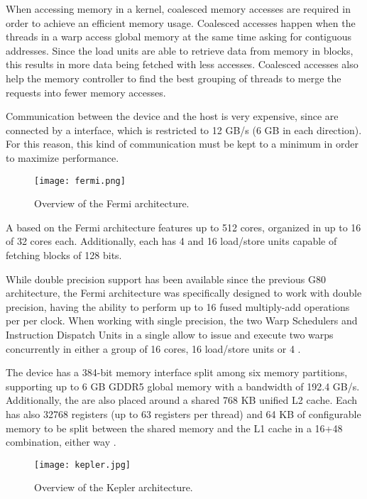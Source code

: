 When accessing memory in a \cuda kernel, coalesced memory accesses are required in order to achieve an efficient memory usage. Coalesced accesses happen when the threads in a warp access global memory at the same time asking for contiguous addresses. Since the load units are able to retrieve data from memory in blocks, this results in more data being fetched with less accesses. Coalesced accesses also help the memory controller to find the best grouping of threads to merge the requests into fewer memory accesses.

Communication between the device and the host \cpu is very expensive, since \gpus are connected by a \pcie interface, which is restricted to 12 GB/s (6 GB in each direction). For this reason, this kind of communication must be kept to a minimum in order to maximize performance.


\begin{figure}
	\begin{center}
		\texttt{[image: fermi.png]}
	\end{center}
	\caption{Overview of the Fermi architecture.}
	\label{fig:fermi}
\end{figure}
A \gpu based on the Fermi architecture features up to 512 \cuda cores, organized in up to 16 \sms of 32 cores each. Additionally, each \sm has 4 \sfus and 16 load/store units capable of fetching blocks of 128 bits.

While double precision support has been available since the previous G80 architecture, the Fermi architecture was specifically designed to work with double precision, having the ability to perform up to 16 fused multiply-add operations per \sm per clock. When working with single precision, the two Warp Schedulers and Instruction Dispatch Units in a single \sm allow to issue and execute two warps concurrently in either a group of 16 cores, 16 load/store units or 4 \sfus.

The device has a 384-bit memory interface split among six memory partitions, supporting up to 6 GB GDDR5 global memory with a bandwidth of 192.4 GB/s. Additionally, the \sms are also placed around a shared 768 KB unified L2 cache. Each \sm has also 32768 registers (up to 63 registers per thread) and 64 KB of configurable memory to be split between the shared memory and the L1 cache in a 16+48 combination, either way \cite{NVIDIA:FERMI}.

\begin{figure}[!htp]
	\begin{center}
		\texttt{[image: kepler.jpg]}
	\end{center}
	\caption{Overview of the Kepler architecture.}
	\label{fig:kepler}
\end{figure}

